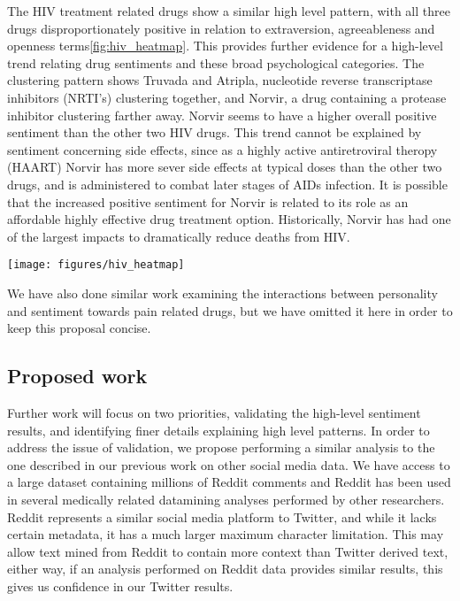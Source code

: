 The HIV treatment related drugs show a similar high level pattern, with all three drugs disproportionately positive in relation to extraversion, agreeableness and openness terms\ref{fig:hiv_heatmap}. This provides further evidence for a high-level trend relating drug sentiments and these broad psychological categories. The clustering pattern shows Truvada and Atripla, nucleotide reverse transcriptase inhibitors (NRTI's) clustering together, and Norvir, a drug containing a protease inhibitor clustering farther away.  Norvir seems to have a higher overall positive sentiment than the other two HIV drugs. This trend cannot be explained by sentiment concerning side effects, since as a highly active antiretroviral theropy (HAART) Norvir has more sever side effects at typical doses than the other two drugs, and is administered to combat later stages of AIDs infection. It is possible that the increased positive sentiment for Norvir is related to its role as an affordable highly effective drug treatment option. Historically, Norvir has had one of the largest impacts to dramatically reduce deaths from HIV\cite{hogg1997decline}.

\begin{figure*}
\centering
\texttt{[image: figures/hiv\_heatmap]}
\caption{Relative similarity for HIV-related drug and personality keywords for positive sentiment tweets relative to negative sentiment tweets. The top 5 personality keywords associated with each of the following big 5 categories are shown in order: extraversion, agreeableness, conscientiousness, openness, neuroticism.}
\label{fig:hiv_heatmap}
\end{figure*}

We have also done similar work examining the interactions between personality and sentiment towards pain related drugs, but we have omitted it here in order to keep this proposal concise.

\subsection{Proposed work}

Further work will focus on two priorities, validating the high-level sentiment results, and identifying finer details explaining high level patterns. In order to address the issue of validation, we propose performing a similar analysis to the one described in our previous work on other social media data. We have access to a large dataset containing millions of Reddit comments and Reddit has been used in several medically related datamining analyses performed by other researchers\cite{chen2015combining}. Reddit represents a similar social media platform to Twitter, and while it lacks certain metadata, it has a much larger maximum character limitation. This may allow text mined from Reddit to contain more context than Twitter derived text, either way, if an analysis performed on Reddit data provides similar results, this gives us confidence in our Twitter results.

